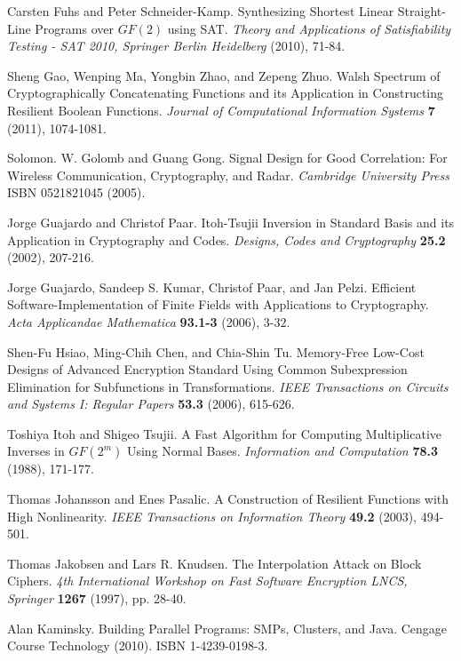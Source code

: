 \documentclass[11pt,american]{report}
\begin{document}
\begin{thebibliography}{9}
 Carsten Fuhs and Peter Schneider-Kamp. Synthesizing Shortest Linear Straight-Line Programs over $GF(2)$ using SAT. \emph{Theory and Applications of Satisfiability Testing - SAT 2010, Springer Berlin Heidelberg} (2010), 71-84.

 Sheng Gao, Wenping Ma, Yongbin Zhao, and Zepeng Zhuo. Walsh Spectrum of Cryptographically Concatenating Functions and its Application in Constructing Resilient Boolean Functions. \emph{Journal of Computational Information Systems} \textbf{7} (2011), 1074-1081.

 Solomon. W. Golomb and Guang Gong. Signal Design for Good Correlation: For Wireless Communication, Cryptography, and Radar. \emph{Cambridge University Press} ISBN 0521821045 (2005).

 Jorge Guajardo and Christof Paar. Itoh-Tsujii Inversion in Standard Basis and its Application in Cryptography and Codes. \emph{Designs, Codes and Cryptography} \textbf{25.2} (2002), 207-216.

 Jorge Guajardo, Sandeep S. Kumar, Christof Paar, and Jan Pelzi. Efficient Software-Implementation of Finite Fields with Applications to Cryptography. \emph{Acta Applicandae Mathematica} \textbf{93.1-3} (2006), 3-32.

 Shen-Fu Hsiao, Ming-Chih Chen, and Chia-Shin Tu. Memory-Free Low-Cost Designs of Advanced Encryption Standard Using Common Subexpression Elimination for Subfunctions in Transformations. \emph{IEEE Transactions on Circuits and Systems I: Regular Papers} \textbf{53.3} (2006), 615-626.

 Toshiya Itoh and Shigeo Tsujii. A Fast Algorithm for Computing Multiplicative Inverses in $GF(2^m)$ Using Normal Bases. \emph{Information and Computation} \textbf{78.3} (1988), 171-177.

 Thomas Johansson and Enes Pasalic. A Construction of Resilient Functions with High Nonlinearity. \emph{IEEE Transactions on Information Theory} \textbf{49.2} (2003), 494-501.

 Thomas Jakobsen and Lars R. Knudsen. The Interpolation Attack on Block Ciphers. \emph{4th International Workshop on Fast Software Encryption LNCS, Springer} \textbf{1267} (1997), pp. 28-40.

 Alan Kaminsky. Building Parallel Programs: SMPs, Clusters, and Java. Cengage Course Technology (2010). ISBN 1-4239-0198-3.


\end{thebibliography}
\end{document}
